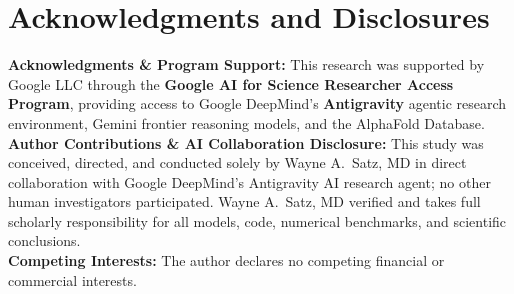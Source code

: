\documentclass[11pt]{article}
\theoremstyle{plain}
\begin{document}
\section*{Acknowledgments and Disclosures}
\small
\noindent\textbf{Acknowledgments \& Program Support:} This research was supported by Google LLC through the \textbf{Google AI for Science Researcher Access Program}, providing access to Google DeepMind's \textbf{Antigravity} agentic research environment, Gemini frontier reasoning models, and the AlphaFold Database.\\[0.25em]
\noindent\textbf{Author Contributions \& AI Collaboration Disclosure:} This study was conceived, directed, and conducted solely by Wayne A.~Satz, MD in direct collaboration with Google DeepMind's Antigravity AI research agent; no other human investigators participated. Wayne A.~Satz, MD verified and takes full scholarly responsibility for all models, code, numerical benchmarks, and scientific conclusions.\\[0.25em]
\noindent\textbf{Competing Interests:} The author declares no competing financial or commercial interests.



\end{document}
